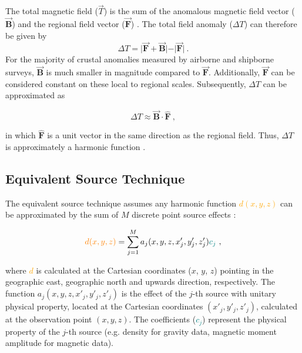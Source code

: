 \noindent
The total magnetic field ($\vec{T}$) is the sum of the anomalous magnetic field vector ($\vec{\mathbf{B}}$) and the regional field vector ($\vec{\mathbf{F}}$) \citep{Blakley1995, Langel1998, OliveiraJr2015}. The total field anomaly ($\Delta T$) can therefore be given by
\begin{equation}
    \Delta T = \vert \vec{\mathbf{F}} + \vec{\mathbf{B}} \vert - \vert \vec{\mathbf{F}} \vert
    \ .
\end{equation}
\noindent
For the majority of crustal anomalies measured by airborne and shipborne surveys, $\vec{\mathbf{B}}$ is much smaller in magnitude compared to $\vec{\mathbf{F}}$. Additionally, $\vec{\mathbf{F}}$ can be considered constant on these local to regional scales. Subsequently, $\Delta T$ can be approximated as

\begin{equation}
\label{eq:tfa_dot_product}
    \Delta T\approx  \vec{\mathbf{B}} \cdot \hat{\mathbf{F}}
    \ ,
\end{equation}

\noindent
in which $\hat{\mathbf{F}}$ is a unit vector in the same direction as the regional field. Thus, $\Delta T$ is approximately a harmonic function \citep{Blakley1995,OliveiraJr2015}.


\subsection{Equivalent Source Technique}

The equivalent source technique assumes any harmonic function \textcolor{orange}{$d(x, y, z)$} can be approximated by the sum of $M$ discrete point source effects \citep{Dampney1969, Cordell1992}:

\begin{equation}
\label{eq:eqs_technique}
\textcolor{orange}{d (x, y, z)} = \sum_{j=1}^{M} a_j(x, y, z, x'_j, y'_j , z'_j) \textcolor{teal}{c_j}
\ ,
\end{equation}

\noindent
where \textcolor{orange}{$d$} is calculated at the Cartesian coordinates ($x$, $y$, $z$) pointing in the geographic east, geographic north and upwards direction, respectively. The function $a_j(x, y, z, x'_j, y'_j , z'_j)$ is the effect of the $j$-th source with unitary physical property, located at the Cartesian coordinates $(x'_j, y'_j, z'_j)$, calculated at the observation point $(x, y, z)$. The coefficients (\textcolor{teal}{$c_j$}) represent the physical property of the $j$-th source 
(e.g. density for gravity data, magnetic moment amplitude for magnetic data).

